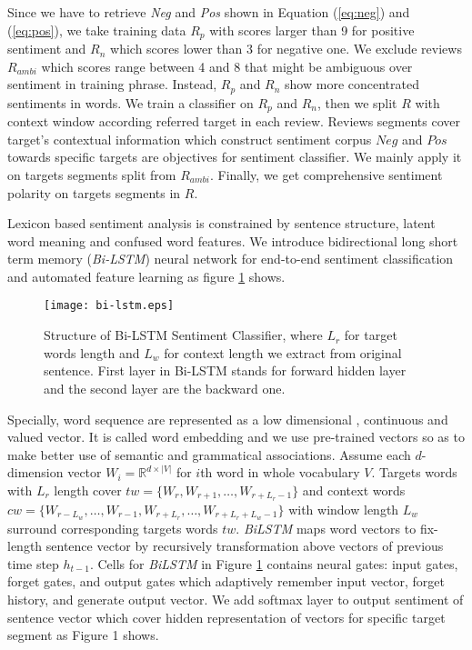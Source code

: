 \par Since we have to retrieve \emph{Neg} and \emph{Pos} shown in Equation (\ref{eq:neg}) and (\ref{eq:pos}), we take training data $R_p$ with scores larger than 9 for positive sentiment and $R_n$ which scores lower than 3 for negative one. We exclude reviews $R_{ambi}$ which scores range between 4 and 8 that might be ambiguous over sentiment in training phrase. Instead, $R_p$ and $R_n$ show more concentrated sentiments in words. We train a classifier on $R_p$ and $R_n$, then we split $R$ with context window according referred target in each review. Reviews segments cover target's contextual information which construct sentiment corpus $Neg$ and $Pos$ towards specific targets are objectives for sentiment classifier. We mainly apply it on targets segments split from $R_{ambi}$. Finally, we get comprehensive sentiment polarity on targets segments in $R$.

\par Lexicon based sentiment analysis is constrained by sentence structure, latent word meaning and confused word features. We introduce bidirectional long short term memory (\emph{Bi-LSTM}) neural network \cite{tang2015target-dependent,chen2017improving} for end-to-end sentiment classification and automated feature learning as figure \ref{fig:lstm} shows.

\begin{figure}[!htbp]
\centering
\texttt{[image: bi-lstm.eps]}
\caption{Structure of Bi-LSTM Sentiment Classifier, where $L_r$ for target words length and $L_w$ for context length we extract from original sentence. First layer in Bi-LSTM stands for forward hidden layer and the second layer are the backward one.}
\label{fig:lstm}
\end{figure}

\par Specially, word sequence are represented as a low dimensional , continuous and valued vector. It is called word embedding and we use pre-trained vectors so as to make better use of semantic and grammatical associations. Assume each $d$-dimension vector $ W_i = \mathbb{R}^{d \times |V|}$ for $i$th word in whole vocabulary $V$. Targets words with $L_r$ length cover $tw = \{W_r, W_{r+1}, \dots, W_{r+L_r-1}\}$ and context words $cw = \{W_{r-L_w}, \dots, W_{r-1}, W_{r+L_r}, \dots, W_{r+L_r+L_w-1}\}$ with window length $L_w$ surround corresponding targets words $tw$. \emph{BiLSTM} maps word vectors to fix-length sentence vector by recursively transformation above vectors of previous time step $h_{t-1}$. Cells for \emph{BiLSTM} in Figure \ref{fig:lstm} contains neural gates: input gates, forget gates, and output gates which adaptively remember input vector, forget history, and generate output vector. We add softmax layer to output sentiment of sentence vector which cover hidden representation of vectors for specific target segment as Figure 1 shows.


